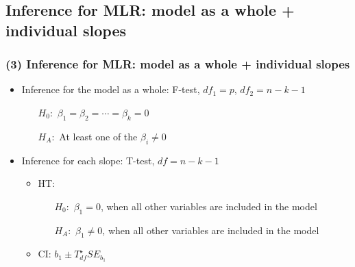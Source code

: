 \documentclass[11pt,containsverbatim,handout,xcolor=xelatex,dvipsnames,table]{beamer}
\begin{document}

\subsection{Inference for MLR: model as a whole + individual slopes}
\label{mi3}


\begin{frame}
\frametitle{(3) Inference for MLR: model as a whole + individual slopes}

\begin{itemize}

\item Inference for the model as a whole: F-test, $df_1 = p$, $df_2 = n - k - 1$
\begin{itemize}
\item[$H_0:$] $\beta_1 = \beta_2 = \cdots = \beta_k = 0$
\item[$H_A:$] At least one of the $\beta_i \ne 0$
\end{itemize}

\pause

\item Inference for each slope: T-test, $df = n - k - 1$
\begin{itemize}
\item HT:
\begin{itemize}
\item[$H_0:$] $\beta_1 = 0$, when all other variables are included in the model
\item[$H_A:$] $\beta_1 \ne 0$, when all other variables are included in the model
\end{itemize}
\item CI: $b_1 \pm T^\star_{df} SE_{b_1}$
\end{itemize}

\end{itemize}

\end{frame}

\end{document}
